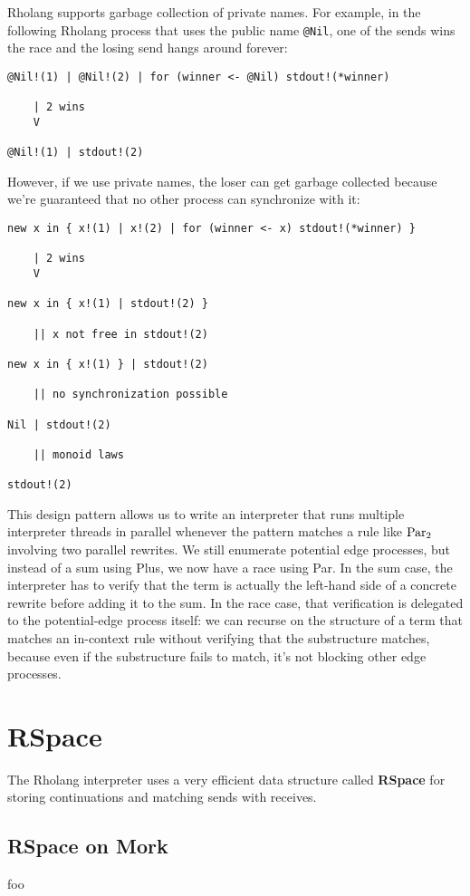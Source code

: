 \documentclass{article}
\begin{document}
Rholang supports garbage collection of private names.  For example, in the following Rholang process that uses the public name \verb+@Nil+, one of the sends wins the race and the losing send hangs around forever:

\begin{verbatim}
@Nil!(1) | @Nil!(2) | for (winner <- @Nil) stdout!(*winner)

    | 2 wins
    V

@Nil!(1) | stdout!(2)
\end{verbatim}

\noindent However, if we use private names, the loser can get garbage collected because we're guaranteed that no other process can synchronize with it:

\begin{verbatim}
new x in { x!(1) | x!(2) | for (winner <- x) stdout!(*winner) }

    | 2 wins
    V

new x in { x!(1) | stdout!(2) }

    || x not free in stdout!(2)

new x in { x!(1) } | stdout!(2)

    || no synchronization possible

Nil | stdout!(2)

    || monoid laws

stdout!(2)
\end{verbatim}

This design pattern allows us to write an interpreter that runs multiple interpreter threads in parallel whenever the pattern matches a rule like ${\rm Par}_2$ involving two parallel rewrites.  We still enumerate potential edge processes, but instead of a sum using Plus, we now have a race using Par.  In the sum case, the interpreter has to verify that the term is actually the left-hand side of a concrete rewrite before adding it to the sum.  In the race case, that verification is delegated to the potential-edge process itself: we can recurse on the structure of a term that matches an in-context rule without verifying that the substructure matches, because even if the substructure fails to match, it's not blocking other edge processes.

\section{RSpace}

The Rholang interpreter uses a very efficient data structure called \textbf{RSpace} for storing continuations and matching sends with receives.  

\subsection{RSpace on Mork}

foo
\end{document}

